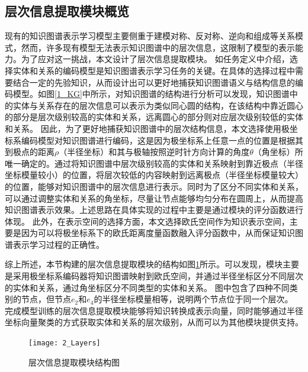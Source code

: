 \documentclass[algorithmlist, AutoFakeBold, AutoFakeSlant, figurelist, tablelist, nomlist, engineering]{seuthesix}
\begin{document}
\subsection{层次信息提取模块概览}
现有的知识图谱表示学习模型主要侧重于建模对称、反对称、逆向和组成等关系模式，然而，许多现有模型无法表示知识图谱中的层次信息，这限制了模型的表示能力。为了应对这一挑战，本文设计了层次信息提取模块。
如任务定义中介绍，选择实体和关系的编码模型是知识图谱表示学习任务的关键。在具体的选择过程中需要结合一定的先验知识，从而设计出可以更好地捕获知识图谱语义与结构信息的编码模型。如图\ref{1_KG}中所示，对知识图谱的结构进行分析可以发现，知识图谱中的实体与关系存在的层次信息可以表示为类似同心圆的结构，在该结构中靠近圆心的部分是层次级别较高的实体和关系，远离圆心的部分则对应层次级别较低的实体和关系。
因此，为了更好地捕获知识图谱中的层次结构信息，本文选择使用极坐标系编码模型对知识图谱进行编码，这是因为极坐标系上任意一点的位置是根据其到极点的距离$\rho$（半径坐标）和其与极轴按照逆时针方向计算的角度$\theta$（角坐标）所唯一确定的。通过将知识图谱中层次级别较高的实体和关系映射到靠近极点（半径坐标模量较小）的位置，将层次较低的内容映射到远离极点（半径坐标模量较大）的位置，能够对知识图谱中的层次信息进行表示。同时为了区分不同实体和关系，可以通过调整实体和关系的角坐标，尽量让节点能够均匀分布在圆周上，从而提高知识图谱表示效果。上述思路在具体实现的过程中主要是通过模块的评分函数进行体现。
此外，在表示空间的选择方面，本文选择欧氏空间作为知识表示空间，主要是因为可以将极坐标系下的欧氏距离度量函数融入评分函数中，从而保证知识图谱表示学习过程的正确性。

综上所述，本节构建的层次信息提取模块的结构如图\ref{2_Layers}所示。可以发现，模块主要是采用极坐标系编码器将知识图谱映射到欧氏空间，并通过半径坐标区分不同层次的实体和关系，通过角坐标区分不同类型的实体和关系。
图中包含了四种不同类别的节点，但节点$e_2$和$e_4$的半径坐标模量相等，说明两个节点位于同一个层次。
完成模型训练的层次信息提取模块能够将知识转换成表示向量，同时能够通过半径坐标向量聚类的方式获取实体和关系的层次级别，从而可以为其他模块提供支持。
\begin{figure}
  \centering
  \texttt{[image: 2\_Layers]}
  \caption{层次信息提取模块结构图}
  \label{2_Layers}
\end{figure}
\end{document}
